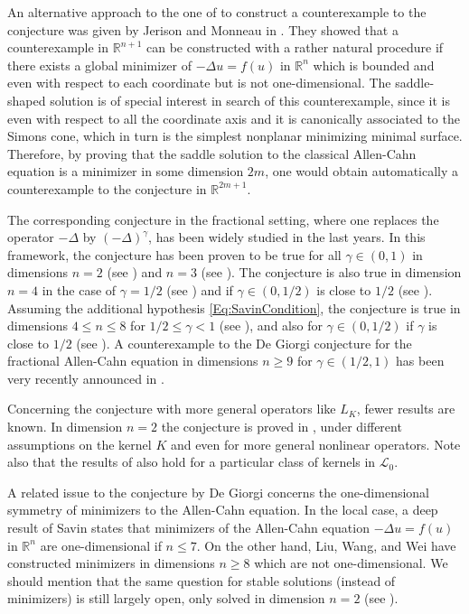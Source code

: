 \documentclass[12pt,reqno]{amsart}
\theoremstyle{definition}
\theoremstyle{remark}
\newcommand{\con}[1]{\mathbb{#1}}
\newcommand{\R}{\con{R}} %
\newcommand{\lcal}{\mathcal{L}}
\newcommand{\s}{\gamma}
\newcommand{\fraclaplacian}{(-\Delta)^\s}
\numberwithin{equation}{section}
\begin{document}
An alternative approach to the one of \cite{delPinoKowalczykWei} to construct a counterexample to the conjecture was given by Jerison and Monneau in \cite{JerisonMonneau}. They showed that a counterexample in $\R^{n+1}$ can be constructed with a rather natural procedure if there exists a global minimizer of $-\Delta u = f(u)$ in $\R^n$ which is bounded and even with respect to each coordinate but is not one-dimensional. The saddle-shaped solution is of special interest in search of this counterexample, since it is even with respect to all the coordinate axis and it is canonically associated to the Simons cone, which in turn is the simplest nonplanar minimizing minimal surface. Therefore, by proving that the saddle solution to the classical Allen-Cahn equation is a minimizer in some dimension $2m$, one would obtain automatically a counterexample to the conjecture in $\R^{2m+1}$.

The corresponding conjecture in the fractional setting, where one replaces the operator $-\Delta$ by $\fraclaplacian$, has been widely studied in the last years. In this framework, the conjecture has been proven to be true for all $\s\in(0,1)$ in dimensions $n=2$ (see \cite{CabreSolaMorales,CabreSireI,SireValdinoci}) and $n=3$ (see \cite{CabreCinti-EnergyHalfL, CabreCinti-SharpEnergy,DipierroFarinaValdinoci}). The conjecture is also true in dimension $n=4$ in the case of $\s = 1/2$ (see \cite{FigalliSerra}) and if $\s\in(0,1/2)$ is close to $1/2$ (see \cite{CabreCintiSerra-Stable}). Assuming the additional hypothesis \eqref{Eq:SavinCondition}, the conjecture is true in dimensions $4\leq n \leq 8$ for $1/2 \leq \s < 1$ (see \cite{Savin-Fractional,Savin-Fractional2}), and also for $\s\in(0,1/2)$ if $\s$ is close to $1/2$ (see \cite{DipierroSerraValdinoci}). A counterexample to the De Giorgi conjecture for the fractional Allen-Cahn equation in dimensions $n \geq 9$ for $\s \in (1/2,1)$ has been very recently announced in \cite{ChanLiuWei}.

Concerning the conjecture with more general operators like $L_K$, fewer results are known. In dimension $n=2$ the conjecture is proved in \cite{HamelRosOtonSireValdinoci, Bucur, FazlySire}, under different assumptions on the kernel $K$ and even for more general nonlinear operators. Note also that the results of \cite{DipierroSerraValdinoci} also hold for a particular class of kernels in $\lcal_0$.


A related issue to the conjecture by De Giorgi concerns the one-dimensional symmetry of minimizers to the Allen-Cahn equation. In the local case, a deep result of Savin \cite{Savin-DeGiorgi} states that minimizers of the Allen-Cahn equation $-\Delta u = f(u)$ in $\R^n$ are one-dimensional if $n\leq 7$. On the other hand, Liu, Wang, and Wei \cite{LiuWangWei} have constructed minimizers in dimensions $n\geq 8$ which are not one-dimensional. We should mention that the same question for stable solutions (instead of minimizers) is still largely open, only solved in dimension $n=2$ (see \cite{GhoussoubGui,BerestyckiCaffarelliNiremberg-Qualitative}).
\end{document}
